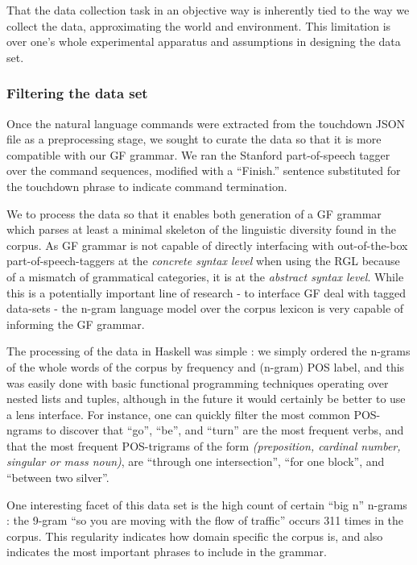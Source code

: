 \documentclass[a4paper, 11pt]{article}
\begin{document}
That the data collection task in an objective way is inherently tied to the way
we collect the data, approximating the world and environment. This limitation is
over one's whole experimental apparatus and assumptions in designing the data set. 

\subsubsection{Filtering the data set}

Once the natural language commands were extracted from the touchdown JSON file as a preprocessing stage,
we sought to curate the data so that it is more compatible with our GF grammar. We ran the Stanford part-of-speech tagger
\cite{toutanova-etal-2003-feature} over the command sequences, modified with a
``Finish.'' sentence substituted for the touchdown phrase to indicate command
termination.

We to process the data so that it enables both generation of a GF grammar which
parses at least a minimal skeleton of the linguistic diversity found in the
corpus. As GF grammar is not capable of directly interfacing with out-of-the-box
part-of-speech-taggers at the \emph{concrete syntax level} when using the RGL
because of a mismatch of grammatical categories, it is at the \emph{abstract
syntax level}. While this is a potentially important line of research - to 
interface GF deal with tagged data-sets - the n-gram language model over
the corpus  lexicon is very capable of informing the GF grammar.

The processing of the data in Haskell was simple : we simply ordered the n-grams
of the whole words of the corpus by frequency and (n-gram) POS label, and this
was easily done with basic functional programming techniques operating over
nested lists and tuples, although in the future it would certainly be better to use a lens
interface. For instance, one can quickly filter the most common
POS-ngrams to discover that ``go'', ``be'', and ``turn'' are the most frequent
verbs, and that the most frequent POS-trigrams of the form \emph{(preposition,
cardinal number, singular or mass noun)}, are ``through one intersection'', ``for
one block'', and ``between two silver''.

One interesting facet of this data set is the high count of certain ``big n''
n-grams : the 9-gram ``so you are moving with the flow of traffic'' occurs 311
times in the corpus. This regularity indicates how domain specific the corpus
is, and also indicates the most important phrases to include in the grammar.
\end{document}
